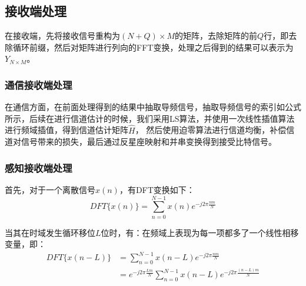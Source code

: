 \documentclass[12pt, a4paper, oneside]{ctexart}
\begin{document}
\subsection*{\heiti{} 接收端处理}
在接收端，先将接收信号重构为$(N+Q)\times M$的矩阵，去除矩阵的前$Q$行，即去除循环前缀，然后对矩阵进行列向的FFT变换，处理之后得到的结果可以表示为$Y_{N\times M}$。
\subsubsection*{\heiti{} 通信接收端处理}
在通信方面，在前面处理得到的结果中抽取导频信号，抽取导频信号的索引如公式所示，后续在进行信道估计的时候，我们采用LS算法，并使用一次线性插值算法进行频域插值，得到信道估计矩阵$\widehat{H}$，
然后使用迫零算法进行信道均衡，补偿信道对信号带来的损失，最后通过反星座映射和并串变换得到接受比特信号。
\subsubsection*{\heiti{} 感知接收端处理}
首先，对于一个离散信号$x(n)$，有DFT变换如下：
$$
DFT\{x(n)\}=\sum_{n=0}^{N-1}x(n)e^{-j2\pi \frac{nm}{N}}
$$

当其在时域发生循环移位$L$位时，有：在频域上表现为每一项都多了一个线性相移变量，即：
$$
\begin{aligned}
DFT\{x(n-L)\}&=\sum_{n=0}^{N-1}x(n-L)e^{-j2\pi \frac{nm}{N}} \\
&=e^{-j2\pi \frac{Lm}{N}}\sum_{n=0}^{N-1}x(n-L)e^{-j2\pi \frac{(n-L)m}{N}} \\
\end{aligned}
$$
\end{document}

